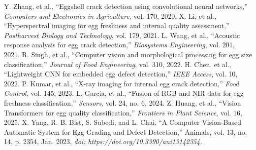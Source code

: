 \documentclass[conference]{IEEEtran}
\begin{document}
	\begin{thebibliography}{00}
		 Y. Zhang, et al., ``Eggshell crack detection using convolutional neural networks,'' \textit{Computers and Electronics in Agriculture}, vol. 170, 2020.
		 X. Li, et al., ``Hyperspectral imaging for egg freshness and internal quality assessment,'' \textit{Postharvest Biology and Technology}, vol. 179, 2021.
		 L. Wang, et al., ``Acoustic response analysis for egg crack detection,'' \textit{Biosystems Engineering}, vol. 201, 2021.
		 R. Singh, et al., ``Computer vision and morphological processing for egg size classification,'' \textit{Journal of Food Engineering}, vol. 310, 2022.
		 H. Chen, et al., ``Lightweight CNN for embedded egg defect detection,'' \textit{IEEE Access}, vol. 10, 2022.
		 P. Kumar, et al., ``X-ray imaging for internal egg crack detection,'' \textit{Food Control}, vol. 145, 2023.
		 L. Garcia, et al., ``Fusion of RGB and NIR data for egg freshness classification,'' \textit{Sensors}, vol. 24, no. 6, 2024.
		 Z. Huang, et al., ``Vision Transformers for egg quality classification,'' \textit{Frontiers in Plant Science}, vol. 16, 2025.
		 X. Yang, R. B. Bist, S. Subedi, and L. Chai, “A Computer Vision-Based Automatic System for Egg Grading and Defect Detection,” Animals, vol. 13, no. 14, p. 2354, Jan. 2023, \textit{doi: https://doi.org/10.3390/ani13142354.}
	\end{thebibliography}
	
\end{document}
